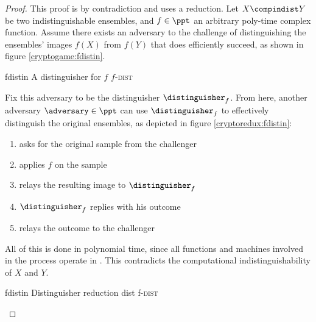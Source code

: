 \begin{proof}
    This proof is by contradiction and uses a reduction. Let $X \compindist Y$ be two indistinguishable ensembles, and $f \in \ppt$ an arbitrary poly-time complex function. Assume there exists an adversary \adversary{} to the challenge of distinguishing the ensembles' images $f(X)$ from $f(Y)$ that does efficiently succeed, as shown in figure \ref{cryptogame:fdistin}. 
    
    \begin{cryptogame}
        {fdistin}
        {A distinguisher for $f$}
        {$f$-\textsc{dist}}


        \cseqdelay


    \end{cryptogame}
    
    Fix this adversary to be the distinguisher $\distinguisher_f$. From here, another adversary $\adversary \in \ppt$ can use $\distinguisher_f$ to effectively distinguish the original ensembles, as depicted in figure \ref{cryptoredux:fdistin}:
    \begin{enumerate}
        \item \adversary{} asks for the original sample from the challenger
        \item \adversary{} applies $f$ on the sample
        \item \adversary{} relays the resulting image to $\distinguisher_f$
        \item $\distinguisher_f$ replies with his outcome
        \item \adversary{} relays the outcome to the challenger
    \end{enumerate}
    All of this is done in polynomial time, since all functions and machines involved in the process operate in \ppt. This contradicts the computational indistinguishability of $X$ and $Y$.

    \begin{cryptoredux}
        {fdistin}
        {Distinguisher reduction}
        {dist}
        {f-\textsc{dist}}
        

\end{cryptoredux}
\end{proof}
